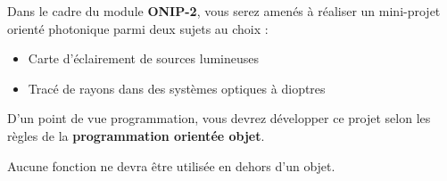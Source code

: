 
Dans le cadre du module \textbf{ONIP-2}, vous serez amenés à réaliser un mini-projet orienté photonique parmi deux sujets au choix : 

\begin{itemize}
	\item Carte d'éclairement de sources lumineuses
	\item Tracé de rayons dans des systèmes optiques à dioptres
\end{itemize}




\medskip

D'un point de vue programmation, vous devrez développer ce projet selon les règles de la \textbf{programmation orientée objet}.

Aucune fonction ne devra être utilisée en dehors d'un objet.